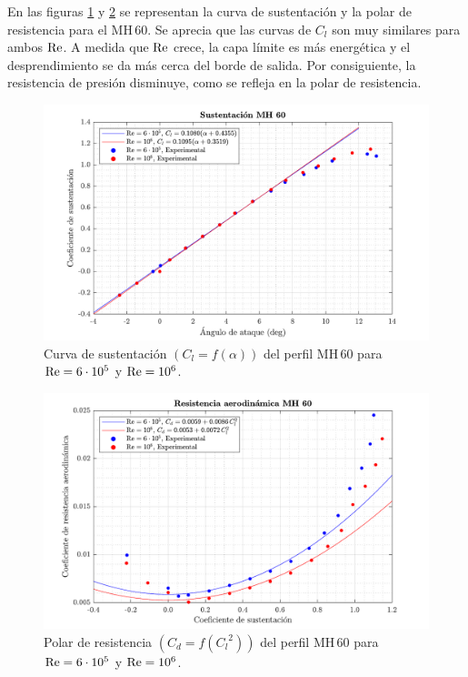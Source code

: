 En las figuras \ref{fig:mh60_lift} y \ref{fig:mh60_polar} se representan la curva de sustentación y la polar de resistencia para el $\mathrm{MH}\,60$. Se aprecia que las curvas de $C_l$ son muy similares para ambos $\mathrm{Re}$. A medida que $\mathrm{Re}$ crece, la capa límite es más energética y el desprendimiento se da más cerca del borde de salida. Por consiguiente, la resistencia de presión disminuye, como se refleja en la polar de resistencia. 
\begin{figure}[ht]
    \centering
    \includegraphics[width=\linewidth]{imagenes/eleccion_perfil/mh60_lift.pdf}
    \caption{Curva de sustentación $\left( C_l = f \left( \alpha \right) \right)$ del perfil $\mathrm{MH}\,60$ para $\mathrm{Re} = 6 \cdot 10^5$ y $\mathrm{Re} = 10^6$.}
    \label{fig:mh60_lift}
    \vspace{-4mm}
\end{figure}

\begin{figure}[ht]
    \centering
    \includegraphics[width=\linewidth]{imagenes/eleccion_perfil/mh60_polar.pdf}
    \caption{Polar de resistencia $\left( C_d = f \left( {C_l}^2 \right) \right)$ del perfil $\mathrm{MH}\,60$ para $\mathrm{Re} = 6 \cdot 10^5$ y $\mathrm{Re} = 10^6$.}
    \label{fig:mh60_polar}
    \vspace{-4mm}
\end{figure}


